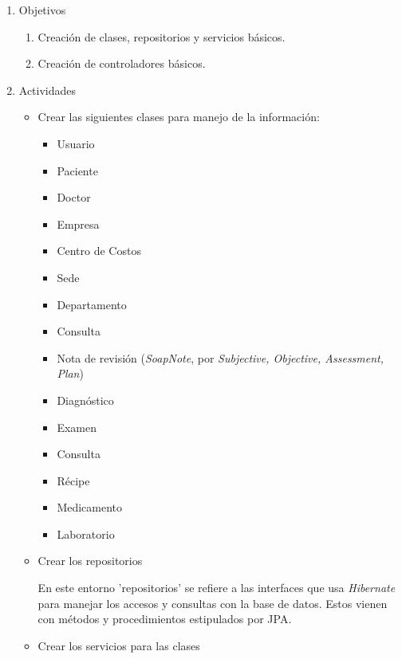     \begin{enumerate}
        \item Objetivos
        \begin{enumerate}
            \item Creación de clases, repositorios y servicios básicos.
            \item Creación de controladores básicos.
        \end{enumerate}
        \item Actividades
        \begin{itemize}
            \item Crear las siguientes clases para manejo de la información:
            \begin{itemize}
                \item Usuario
                \item Paciente
                \item Doctor
                \item Empresa
                \item Centro de Costos
                \item Sede
                \item Departamento
                \item Consulta
                \item Nota de revisión (\textit{SoapNote}, por \textit{Subjective, Objective, Assessment, Plan})
                \item Diagnóstico
                \item Examen
                \item Consulta
                \item Récipe
                \item Medicamento
                \item Laboratorio
            \end{itemize}
            
            \item Crear los repositorios
            
            En este entorno 'repositorios' se refiere a las interfaces que usa \textit{Hibernate} para manejar los accesos y consultas con la base de datos. Estos vienen con métodos y procedimientos estipulados por JPA.
             
            \item Crear los servicios para las clases
            

\end{itemize}
\end{enumerate}
